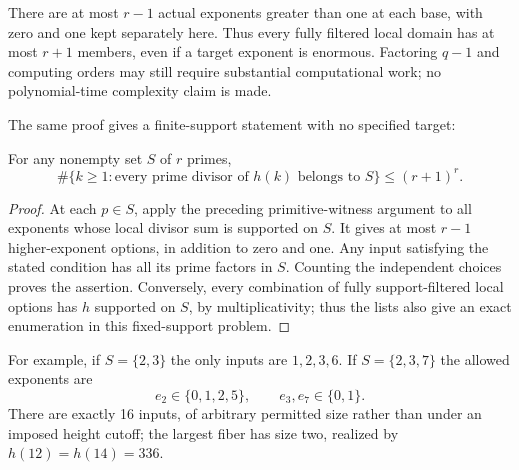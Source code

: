 There are at most $r-1$ actual exponents greater than one at each base, with zero and one kept separately here. Thus every fully filtered local domain has at most $r+1$ members, even if a target exponent is enormous. Factoring $q-1$ and computing orders may still require substantial computational work; no polynomial-time complexity claim is made.

The same proof gives a finite-support statement with no specified target:
\begin{corollary}
For any nonempty set $S$ of $r$ primes,
\[
 \#\{k\ge1:\text{every prime divisor of }h(k)\text{ belongs to }S\}
 \le(r+1)^r.
\]
\end{corollary}
\begin{proof}
At each $p\in S$, apply the preceding primitive-witness argument to all exponents whose local divisor sum is supported on $S$. It gives at most $r-1$ higher-exponent options, in addition to zero and one. Any input satisfying the stated condition has all its prime factors in $S$. Counting the independent choices proves the assertion. Conversely, every combination of fully support-filtered local options has $h$ supported on $S$, by multiplicativity; thus the lists also give an exact enumeration in this fixed-support problem.
\end{proof}

For example, if $S=\{2,3\}$ the only inputs are $1,2,3,6$. If $S=\{2,3,7\}$ the allowed exponents are
\[
 e_2\in\{0,1,2,5\},\qquad e_3,e_7\in\{0,1\}.
\]
There are exactly 16 inputs, of arbitrary permitted size rather than under an imposed height cutoff; the largest fiber has size two, realized by $h(12)=h(14)=336$.

